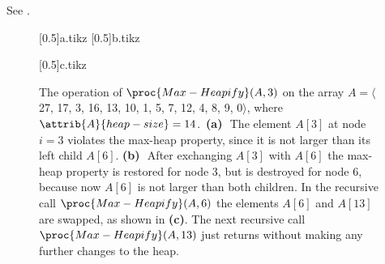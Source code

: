 See .
\begin{figure}[htb]
    \subcaptionbox{\label{fig:6.2-1a}}[0.5\textwidth]{{a.tikz}}
    \subcaptionbox{\label{fig:6.2-1b}}[0.5\textwidth]{{b.tikz}}
    \par\vspace{\vertexsize}
    \subcaptionbox{\label{fig:6.2-1c}}[0.5\textwidth]{{c.tikz}}
    \caption{The operation of $\proc{Max-Heapify}(A,3)$ on the array $A=\langle$27, 17, 3, 16, 13, 10, 1, 5, 7, 12, 4, 8, 9, 0$\rangle$, where $\attrib{A}{heap-size}=14$.\,
    \textbf{(a)}\,~The element $A[3]$ at node $i=3$ violates the max-heap property, since it is not larger than its left child $A[6]$.
    \textbf{(b)}\,~After exchanging $A[3]$ with $A[6]$ the max-heap property is restored for node 3, but is destroyed for node 6, because now $A[6]$ is not larger than both children.
    In the recursive call $\proc{Max-Heapify}(A,6)$ the elements $A[6]$ and $A[13]$ are swapped, as shown in \textbf{(c)}.
    The next recursive call $\proc{Max-Heapify}(A,13)$ just returns without making any further changes to the heap.} \label{fig:6.2-1}
\end{figure}
